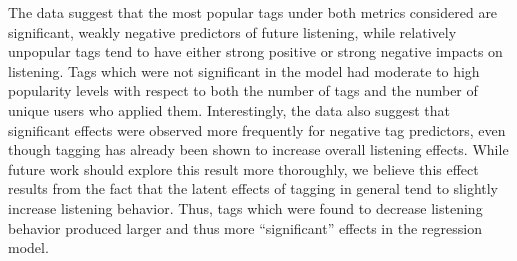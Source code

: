 The data suggest that the most popular tags under both metrics considered are significant, weakly negative predictors of future listening, while relatively unpopular tags tend to have either strong positive or strong negative impacts on listening. Tags which were not significant in the model had moderate to high popularity levels with respect to both the number of tags and the number of unique users who applied them.  Interestingly, the data also suggest that significant effects were observed more frequently for negative tag predictors, even though tagging has already been shown to increase overall listening effects.  While future work should explore this result more thoroughly, we believe this effect results from the fact that the latent effects of tagging in general tend to slightly increase listening behavior.  Thus, tags which were found to decrease listening behavior produced larger and thus more ``significant'' effects in the regression model.

